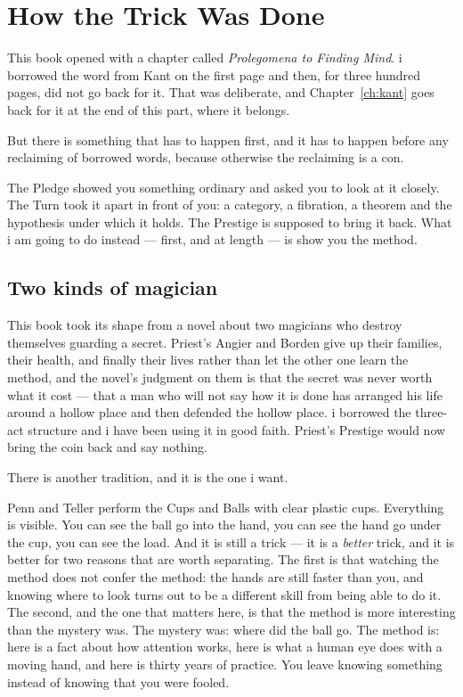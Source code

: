 \chapter{How the Trick Was Done}
\label{ch:trick}

This book opened with a chapter called \emph{Prolegomena to Finding
Mind}.
i borrowed the word from Kant on the first page and then, for three
hundred pages, did not go back for it.
That was deliberate, and Chapter~\ref{ch:kant} goes back for it at
the end of this part, where it belongs.

But there is something that has to happen first, and it has to
happen before any reclaiming of borrowed words, because otherwise
the reclaiming is a con.

The Pledge showed you something ordinary and asked you to look at
it closely.
The Turn took it apart in front of you: a category, a fibration, a
theorem and the hypothesis under which it holds.
The Prestige is supposed to bring it back.
What i am going to do instead --- first, and at length --- is show
you the method.

\section{Two kinds of magician}
\label{sec:two-magicians}

This book took its shape from a novel about two magicians who
destroy themselves guarding a secret.
Priest's Angier and Borden give up their families, their health,
and finally their lives rather than let the other one learn the
method, and the novel's judgment on them is that the secret was
never worth what it cost --- that a man who will not say how it is
done has arranged his life around a hollow place and then defended
the hollow place.
i borrowed the three-act structure and i have been using it in good
faith.
Priest's Prestige would now bring the coin back and say nothing.

There is another tradition, and it is the one i want.

Penn and Teller perform the Cups and Balls with clear plastic cups.
Everything is visible.
You can see the ball go into the hand, you can see the hand go
under the cup, you can see the load.
And it is still a trick --- it is a \emph{better} trick, and it is
better for two reasons that are worth separating.
The first is that watching the method does not confer the method:
the hands are still faster than you, and knowing where to look
turns out to be a different skill from being able to do it.
The second, and the one that matters here, is that the method is
more interesting than the mystery was.
The mystery was: where did the ball go.
The method is: here is a fact about how attention works, here is
what a human eye does with a moving hand, and here is thirty years
of practice.
You leave knowing something instead of knowing that you were
fooled.

